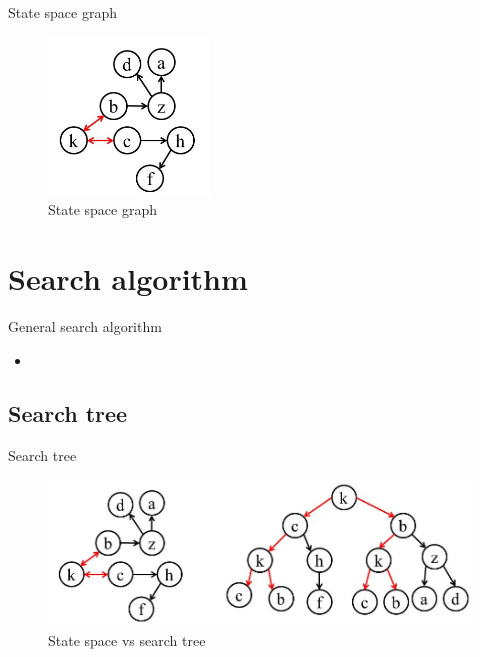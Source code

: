 \documentclass{beamer}
\begin{document}
\begin{frame}{State space graph}
\pause
\begin{figure}
\centering
	\includegraphics[width=0.6\linewidth]{state_space_graph.png}
	\caption{State space graph}
\end{figure}
\end{frame}

\section{Search algorithm}

\begin{frame}{General search algorithm}
	\begin{itemize}
		\item 
	\end{itemize}
\end{frame}

\subsection{Search tree}

\begin{frame}{Search tree}

\begin{figure}
\centering
	\includegraphics[width=\linewidth]{state_space_vs_search_tree.png}
	\caption{State space vs search tree}
\end{figure}

\end{frame}
\end{document}
